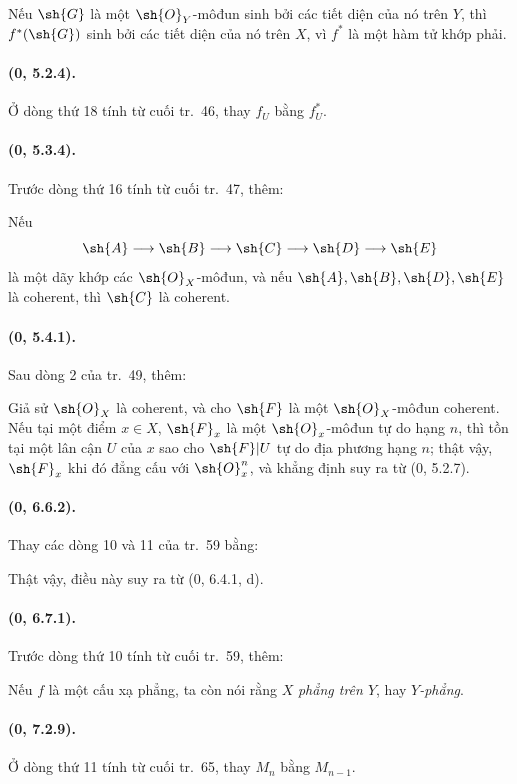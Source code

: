 \documentclass[oneside,10pt]{amsart}
\makeatletter
\newcommand{\ega@arrow}[2]{\mathchoice{#1}{#2}{#2}{#2}}
\renewcommand{\to}{\ega@arrow{\longrightarrow}{\rightarrow}}
\makeatother
\begin{document}
Nếu $\sh{G}$ là một $\sh{O}_Y$-môđun sinh bởi các tiết diện của nó
trên $Y$, thì $f^*(\sh{G})$ sinh bởi các tiết diện của nó trên $X$, vì
$f^*$ là một hàm tử khớp phải.

\paragraph{(0, 5.2.4).}
Ở dòng thứ 18 tính từ cuối tr.~46, thay $f_U$ bằng $f_U^*$.

\paragraph{(0, 5.3.4).}
Trước dòng thứ 16 tính từ cuối tr.~47, thêm:

Nếu
\[
  \sh{A}\to\sh{B}\to\sh{C}\to\sh{D}\to\sh{E}
\]
là một dãy khớp các $\sh{O}_X$-môđun, và nếu
$\sh{A},\sh{B},\sh{D},\sh{E}$ là coherent, thì $\sh{C}$ là coherent.

\paragraph{(0, 5.4.1).}
Sau dòng 2 của tr.~49, thêm:

Giả sử $\sh{O}_X$ là coherent, và cho $\sh{F}$ là một
$\sh{O}_X$-môđun coherent. Nếu tại một điểm $x\in X$, $\sh{F}_x$ là
một $\sh{O}_x$-môđun tự do hạng $n$, thì tồn tại một lân cận $U$ của
$x$ sao cho $\sh{F}|U$ tự do địa phương hạng $n$; thật vậy,
$\sh{F}_x$ khi đó đẳng cấu với $\sh{O}_x^n$, và khẳng định suy ra từ
(0, 5.2.7).

\paragraph{(0, 6.6.2).}
Thay các dòng 10 và 11 của tr.~59 bằng:

Thật vậy, điều này suy ra từ (0, 6.4.1, d).

\paragraph{(0, 6.7.1).}
Trước dòng thứ 10 tính từ cuối tr.~59, thêm:

Nếu $f$ là một cấu xạ phẳng, ta còn nói rằng $X$ \emph{phẳng trên
$Y$}, hay \emph{$Y$-phẳng}.

\paragraph{(0, 7.2.9).}
Ở dòng thứ 11 tính từ cuối tr.~65, thay $M_n$ bằng $M_{n-1}$.
\end{document}
